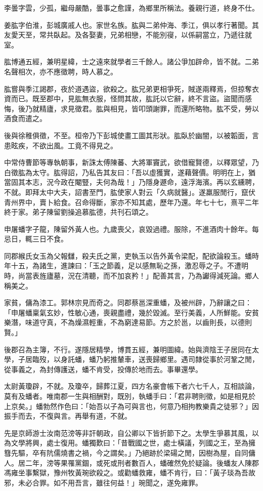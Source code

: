 \begin{pinyinscope}
李曇字雲，少孤，繼母嚴酷，曇事之愈謹，為鄉里所稱法。養親行道，終身不仕。

姜肱字伯淮，彭城廣戚人也。家世名族。肱與二弟仲海、季江，俱以孝行著聞。其友愛天至，常共臥起。及各娶妻，兄弟相戀，不能別寑，以係嗣當立，乃遞往就室。

肱博通五經，兼明星緯，士之遠來就學者三千餘人。諸公爭加辟命，皆不就。二弟名聲相次，亦不應徵聘，時人慕之。

肱嘗與季江謁郡，夜於道遇盜，欲殺之。肱兄弟更相爭死，賊遂兩釋焉，但掠奪衣資而已。既至郡中，見肱無衣服，怪問其故，肱託以它辭，終不言盜。盜聞而感悔，後乃就精廬，求見徵君。肱與相見，皆叩頭謝罪，而還所略物。肱不受，勞以酒食而遣之。

後與徐稚俱徵，不至。桓帝乃下彭城使畫工圖其形狀。肱臥於幽闇，以被韜面，言患眩疾，不欲出風。工竟不得見之。

中常侍曹節等專執朝事，新誅太傅陳蕃、大將軍竇武，欲借寵賢德，以釋眾望，乃白徵肱為太守。肱得詔，乃私告其友曰：「吾以虛獲實，遂藉聲價。明明在上，猶當固其本志，況今政在閹豎，夫何為哉！」乃隱身遯命，遠浮海濱。再以玄纁聘，不就。即拜太中大夫，詔書至門，肱使家人對云「久病就醫」。遂羸服閒行，竄伏青州界中，賣卜給食。召命得斷，家亦不知其處，歷年乃還。年七十七，熹平二年終于家。弟子陳留劉操追慕肱德，共刊石頌之。

申屠蟠字子龍，陳留外黃人也。九歲喪父，哀毀過禮。服除，不進酒肉十餘年。每忌日，輒三日不食。

同郡緱氏女玉為父報讎，殺夫氏之黨，吏執玉以告外黃令梁配，配欲論殺玉。蟠時年十五，為諸生，進諫曰：「玉之節義，足以感無恥之孫，激忍辱之子。不遭明時，尚當表旌廬墓，況在清聽，而不加哀矜！」配善其言，乃為讞得減死論。鄉人稱美之。

家貧，傭為漆工。郭林宗見而奇之。同郡蔡邕深重蟠，及被州辟，乃辭讓之曰：「申屠蟠稟氣玄妙，性敏心通，喪親盡禮，幾於毀滅。至行美義，人所鮮能。安貧樂潛，味道守真，不為燥濕輕重，不為窮達易節。方之於邕，以齒則長，以德則賢。」

後郡召為主簿，不行。遂隱居精學，博貫五經，兼明圖緯。始與濟陰王子居同在太學，子居臨歿，以身託蟠，蟠乃躬推輦車，送喪歸鄉里。遇司隸從事於河鞏之閒，從事義之，為封傳護送，蟠不肯受，投傳於地而去。事畢還學。

太尉黃瓊辟，不就。及瓊卒，歸葬江夏，四方名豪會帳下者六七千人，互相談論，莫有及蟠者。唯南郡一生與相酬對，既別，執蟠手曰：「君非聘則徵，如是相見於上京矣。」蟠勃然作色曰：「始吾以子為可與言也，何意乃相拘教樂貴之徒邪？」因振手而去，不復與言。再舉有道，不就。

先是京師游士汝南范滂等非訐朝政，自公卿以下皆折節下之。太學生爭慕其風，以為文學將興，處士復用。蟠獨歎曰：「昔戰國之世，處士橫議，列國之王，至為擁篲先驅，卒有阬儒燒書之禍，今之謂矣。」乃絕跡於梁碭之閒，因樹為屋，自同傭人。居二年，滂等果罹黨錮，或死或刑者數百人，蟠確然免於疑論。後蟠友人陳郡馮雍坐事繫獄，豫州牧黃琬欲殺之。或勸蟠救雍，蟠不肯行，曰：「黃子琰為吾故邪，未必合罪。如不用吾言，雖往何益！」琬聞之，遂免雍罪。


\end{pinyinscope}
